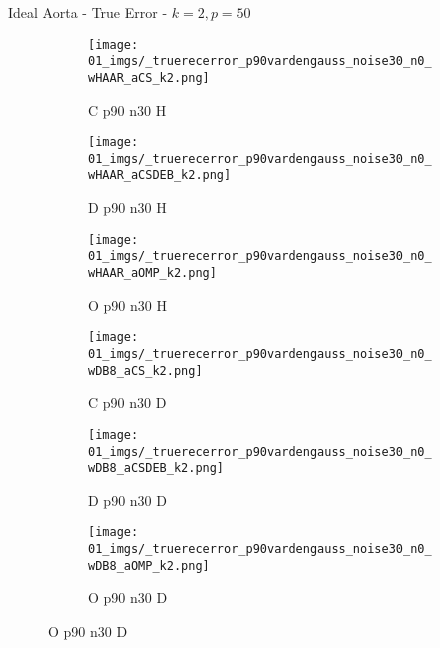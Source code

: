\begin{frame}{Ideal Aorta - True Error - $k=2,p=50$}{}
\begin{figure}
\begin{subfigure}{0.13\textwidth}
\texttt{[image: 01\_imgs/\_truerecerror\_p90vardengauss\_noise30\_n0\_wHAAR\_aCS\_k2.png]}
\caption*{\tiny C p90 n30 H}
\end{subfigure}
\begin{subfigure}{0.13\textwidth}
\texttt{[image: 01\_imgs/\_truerecerror\_p90vardengauss\_noise30\_n0\_wHAAR\_aCSDEB\_k2.png]}
\caption*{\tiny D p90 n30 H}
\end{subfigure}
\begin{subfigure}{0.13\textwidth}
\texttt{[image: 01\_imgs/\_truerecerror\_p90vardengauss\_noise30\_n0\_wHAAR\_aOMP\_k2.png]}
\caption*{\tiny O p90 n30 H}
\end{subfigure}
\begin{subfigure}{0.13\textwidth}
\texttt{[image: 01\_imgs/\_truerecerror\_p90vardengauss\_noise30\_n0\_wDB8\_aCS\_k2.png]}
\caption*{\tiny C p90 n30 D}
\end{subfigure}
\begin{subfigure}{0.13\textwidth}
\texttt{[image: 01\_imgs/\_truerecerror\_p90vardengauss\_noise30\_n0\_wDB8\_aCSDEB\_k2.png]}
\caption*{\tiny D p90 n30 D}
\end{subfigure}
\begin{subfigure}{0.13\textwidth}
\texttt{[image: 01\_imgs/\_truerecerror\_p90vardengauss\_noise30\_n0\_wDB8\_aOMP\_k2.png]}
\caption*{\tiny O p90 n30 D}
\end{subfigure}
\end{figure}
\end{frame}


